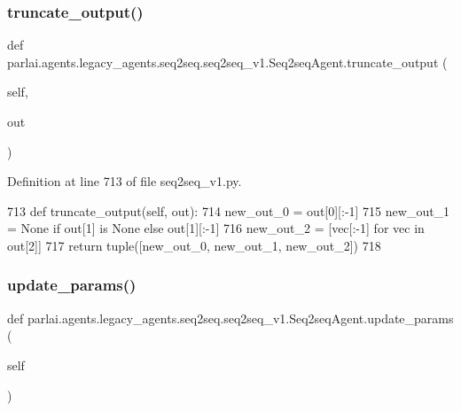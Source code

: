 \subsubsection{\texorpdfstring{truncate\+\_\+output()}{truncate\_output()}}
{\footnotesize\ttfamily def parlai.\+agents.\+legacy\+\_\+agents.\+seq2seq.\+seq2seq\+\_\+v1.\+Seq2seq\+Agent.\+truncate\+\_\+output (\begin{DoxyParamCaption}\item[{}]{self,  }\item[{}]{out }\end{DoxyParamCaption})}



Definition at line 713 of file seq2seq\+\_\+v1.\+py.


\begin{DoxyCode}
713     \textcolor{keyword}{def }truncate\_output(self, out):
714         new\_out\_0 = out[0][:-1]
715         new\_out\_1 = \textcolor{keywordtype}{None} \textcolor{keywordflow}{if} out[1] \textcolor{keywordflow}{is} \textcolor{keywordtype}{None} \textcolor{keywordflow}{else} out[1][:-1]
716         new\_out\_2 = [vec[:-1] \textcolor{keywordflow}{for} vec \textcolor{keywordflow}{in} out[2]]
717         \textcolor{keywordflow}{return} tuple([new\_out\_0, new\_out\_1, new\_out\_2])
718 
\end{DoxyCode}
\mbox{\label{classparlai_1_1agents_1_1legacy__agents_1_1seq2seq_1_1seq2seq__v1_1_1Seq2seqAgent_a3fabaacec11534b452a1786d3dd5a6c8}} 
\subsubsection{\texorpdfstring{update\+\_\+params()}{update\_params()}}
{\footnotesize\ttfamily def parlai.\+agents.\+legacy\+\_\+agents.\+seq2seq.\+seq2seq\+\_\+v1.\+Seq2seq\+Agent.\+update\+\_\+params (\begin{DoxyParamCaption}\item[{}]{self }\end{DoxyParamCaption})}

